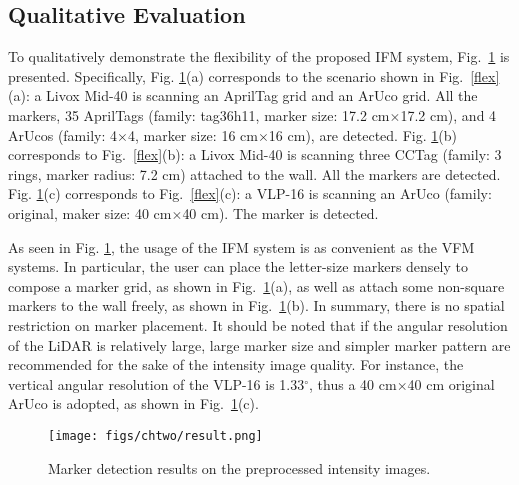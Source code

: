 \subsection{Qualitative Evaluation}
To qualitatively demonstrate the flexibility of the proposed IFM system, Fig.~\ref{result} is presented. 
Specifically, Fig. \ref{result}(a) corresponds to the scenario shown in Fig.~\ref{flex}(a): a Livox Mid-40 is scanning an AprilTag grid and an ArUco grid. All the markers, 35 AprilTags (family: tag36h11, marker size: 17.2 cm$\times$17.2 cm), and 4 ArUcos (family: 4$\times$4, marker size: 16 cm$\times$16 cm), are detected. Fig. \ref{result}(b) corresponds to Fig.~\ref{flex}(b): a Livox Mid-40 is scanning three CCTag (family: 3 rings, marker radius: 7.2 cm) attached to the wall. All the markers are detected. Fig. \ref{result}(c) corresponds to Fig.~\ref{flex}(c): a VLP-16 is scanning an ArUco (family: original, maker size: 40 cm$\times$40 cm). The marker is detected.
\par
As seen in Fig. \ref{result}, the usage of the IFM system is as convenient as the VFM systems. In particular, the user can place the letter-size markers \cite{ap3,aruco} densely to compose a marker grid, as shown in Fig.~\ref{result}(a), as well as attach some non-square markers \cite{cctag} to the wall freely, as shown in Fig.~\ref{result}(b). In summary, there is no spatial restriction on marker placement. It should be noted that if the angular resolution of the LiDAR is relatively large, large marker size and simpler marker pattern are recommended for the sake of the intensity image quality. For instance, the vertical angular resolution of the VLP-16 is 1.33$^{\circ}$, thus a 40 cm$\times$40 cm original ArUco \cite{aruco} is adopted, as shown in Fig.~\ref{result}(c).
\begin{figure}[H] 
	\centering
	\texttt{[image: figs/chtwo/result.png]}
	\caption{Marker detection results on the preprocessed intensity images.}
	\label{result}
\end{figure}

